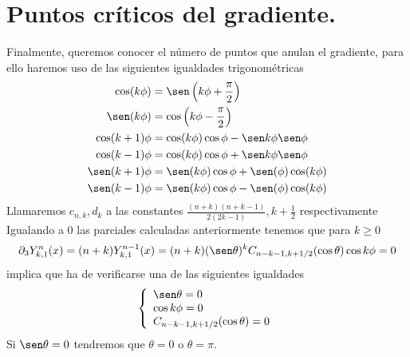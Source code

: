 \section{Puntos críticos del gradiente.}
Finalmente, queremos conocer el número de puntos que anulan el gradiente, para ello haremos uso de las siguientes igualdades trigonométricas
\begin{gather*}
\begin{aligned}
\cos(k\phi) &= \sen\left(k\phi + \frac{\pi}{2}\right) \\
\sen (k\phi) &= \cos\left(k\phi - \frac{\pi}{2}\right) \\
\cos(k+1)\phi &= \cos (k\phi)\cos\phi - \sen k\phi \sen\phi \\
\cos(k-1)\phi &= \cos (k\phi)\cos\phi + \sen k\phi \sen\phi \\
\sen(k+1)\phi &= \sen(k\phi)\cos\phi + \sen(\phi)\cos(k\phi)\\
\sen(k-1)\phi &= \sen(k\phi)\cos\phi - \sen(\phi)\cos(k\phi)\\
\end{aligned}
\end{gather*}
Llamaremos  $c_{n,k},d_k$ a las constantes $\frac{(n+k)(n+k-1)}{2(2k-1)},k+\frac{1}{2}$ respectivamente
Igualando a 0 las parciales calculadas anteriormente tenemos que para $k\ge0$
\begin{gather}
\partial_3 Y_{k,1}^n(x) = (n+k)Y_{k,1}^{n-1}(x) = (n+k)(\sen \theta)^k C_{n-k-1,k+1/2}(\cos \theta) \cos k\phi = 0
\end{gather}
implica que ha de verificarse una de las siguientes igualdades
\begin{gather}
\left\{
\begin{array}{ll}
\sen \theta= 0 \\
\cos k\phi = 0\\
C_{n-k-1,k+1/2}(\cos \theta) = 0
\end{array}
\right.
\end{gather}
Si $\sen \theta = 0$ tendremos que $\theta=0$ o $\theta=\pi$.
\medskip


